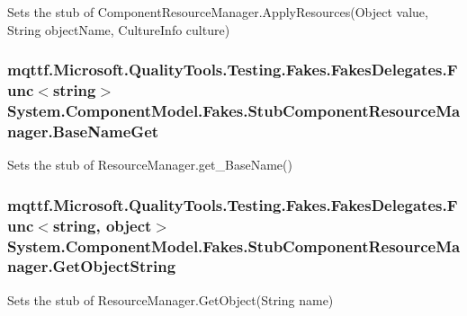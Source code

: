 Sets the stub of Component\-Resource\-Manager.\-Apply\-Resources(\-Object value, String object\-Name, Culture\-Info culture)

\hypertarget{class_system_1_1_component_model_1_1_fakes_1_1_stub_component_resource_manager_adadd925e4975ff61dcbb8303c2f97b19}{
\subsubsection[{Base\-Name\-Get}]{\setlength{\rightskip}{0pt plus 5cm}mqttf.\-Microsoft.\-Quality\-Tools.\-Testing.\-Fakes.\-Fakes\-Delegates.\-Func$<$string$>$ System.\-Component\-Model.\-Fakes.\-Stub\-Component\-Resource\-Manager.\-Base\-Name\-Get}}\label{class_system_1_1_component_model_1_1_fakes_1_1_stub_component_resource_manager_adadd925e4975ff61dcbb8303c2f97b19}


Sets the stub of Resource\-Manager.\-get\-\_\-\-Base\-Name()

\hypertarget{class_system_1_1_component_model_1_1_fakes_1_1_stub_component_resource_manager_a88308081599e7acc6c3c28cbb642d911}{
\subsubsection[{Get\-Object\-String}]{\setlength{\rightskip}{0pt plus 5cm}mqttf.\-Microsoft.\-Quality\-Tools.\-Testing.\-Fakes.\-Fakes\-Delegates.\-Func$<$string, object$>$ System.\-Component\-Model.\-Fakes.\-Stub\-Component\-Resource\-Manager.\-Get\-Object\-String}}\label{class_system_1_1_component_model_1_1_fakes_1_1_stub_component_resource_manager_a88308081599e7acc6c3c28cbb642d911}


Sets the stub of Resource\-Manager.\-Get\-Object(\-String name)

